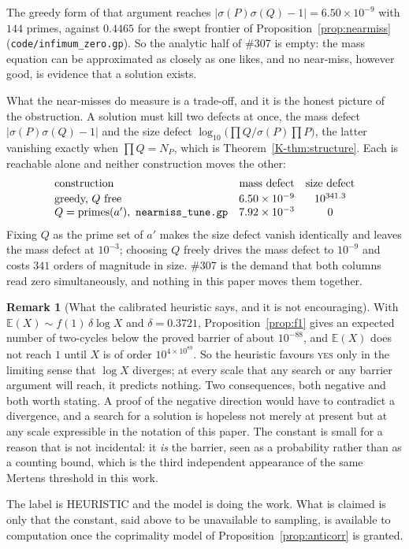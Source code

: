 \documentclass[11pt]{article}
\theoremstyle{definition}
\newtheorem{remark}[theorem]{Remark}
\begin{document}
The greedy form of that argument reaches $|\sigma(P)\sigma(Q)-1|=6.50\times10^{-9}$ with $144$
primes, against $0.4465$ for the swept frontier of Proposition~\ref{prop:nearmiss}
\textup{(\texttt{code/infimum\_zero.gp})}. So the analytic half of \#307 is empty: the mass equation
can be approximated as closely as one likes, and no near-miss, however good, is evidence that a
solution exists.

What the near-misses do measure is a trade-off, and it is the honest picture of the obstruction. A
solution must kill two defects at once, the mass defect $|\sigma(P)\sigma(Q)-1|$ and the size defect
$\log_{10}\bigl(\prod Q\big/\sigma(P)\prod P\bigr)$, the latter vanishing exactly when
$\prod Q=N_P$, which is Theorem~\ref{K-thm:structure}. Each is reachable alone and neither
construction moves the other:
\[
\begin{array}{lcc}
\text{construction} & \text{mass defect} & \text{size defect}\\[2pt]
\text{greedy, } Q \text{ free} & 6.50\times10^{-9} & 10^{341.3}\\
Q=\text{primes}(a'),\ \text{\texttt{nearmiss\_tune.gp}} & 7.92\times10^{-3} & 0
\end{array}
\]
Fixing $Q$ as the prime set of $a'$ makes the size defect vanish identically and leaves the mass
defect at $10^{-3}$; choosing $Q$ freely drives the mass defect to $10^{-9}$ and costs $341$ orders
of magnitude in size. \#307 is the demand that both columns read zero simultaneously, and nothing in
this paper moves them together.

\begin{remark}[What the calibrated heuristic says, and it is not encouraging]\label{rem:calibrated}
With $\mathbb{E}(X)\sim f(1)\,\delta\log X$ and $\delta=0.3721$, Proposition~\ref{prop:f1} gives an
expected number of two-cycles below the proved barrier of about $10^{-88}$, and $\mathbb{E}(X)$ does
not reach $1$ until $X$ is of order $10^{4\times10^{89}}$. So the heuristic favours \textsc{yes} only
in the limiting sense that $\log X$ diverges; at every scale that any search or any barrier argument
will reach, it predicts nothing. Two consequences, both negative and both worth stating. A proof of
the negative direction would have to contradict a divergence, and a search for a solution is
hopeless not merely at present but at any scale expressible in the notation of this paper. The
constant is small for a reason that is not incidental: it \emph{is} the barrier, seen as a
probability rather than as a counting bound, which is the third independent appearance of the same
Mertens threshold in this work.

The label is \textup{HEURISTIC} and the model is doing the work. What is claimed is only that the
constant, said above to be unavailable to sampling, is available to computation once the coprimality
model of Proposition~\ref{prop:anticorr} is granted.
\end{remark}
\end{document}
